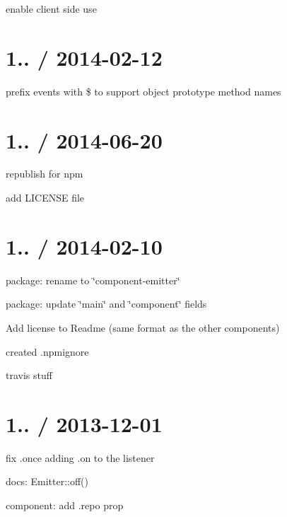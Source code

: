 
\begin{DoxyItemize}
\item enable client side use
\end{DoxyItemize}

\section*{1.. / 2014-\/02-\/12 }


\begin{DoxyItemize}
\item prefix events with {\ttfamily \$} to support object prototype method names
\end{DoxyItemize}

\section*{1.. / 2014-\/06-\/20 }


\begin{DoxyItemize}
\item republish for npm
\item add L\+I\+C\+E\+N\+SE file
\end{DoxyItemize}

\section*{1.. / 2014-\/02-\/10 }


\begin{DoxyItemize}
\item package\+: rename to \char`\"{}component-\/emitter\char`\"{}
\item package\+: update \char`\"{}main\char`\"{} and \char`\"{}component\char`\"{} fields
\item Add license to Readme (same format as the other components)
\item created .npmignore
\item travis stuff
\end{DoxyItemize}

\section*{1.. / 2013-\/12-\/01 }


\begin{DoxyItemize}
\item fix .once adding .on to the listener
\item docs\+: Emitter\+::off()
\item component\+: add {\ttfamily .repo} prop
\end{DoxyItemize}


